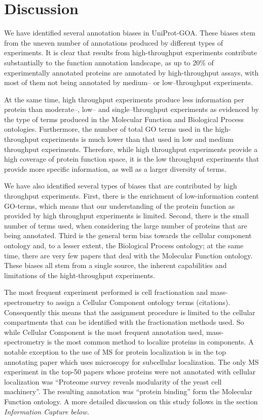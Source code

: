 \documentclass[12pt]{article}
\begin{document}
\section*{Discussion}

We have identified several annotation biases in UniProt-GOA. These biases stem from the
uneven number of annotations produced by different types of experiments. It is clear that
results from high-throughput experiments contribute substantially to the function annotation
landscape, as up to 20\% of experimentally annotated proteins are annotated by
high-throughput assays, with most of them not being annotated by medium-- or
low--\~throughput experiments. 

At the same time, high throughput experiments produce less information per protein than
moderate--, low-- and single--\~throughput experiments as evidenced by the type of terms
produced in the Molecular Function and Biological Process ontologies. Furthermore, the
number of total GO terms used in the high-throughput experiments is much lower than that
used in low and medium throughput experiments. Therefore, while high throughput experiments
provide a high coverage of protein function space, it is the low throughput
experiments that provide more specific information, as well as a larger diversity of terms.

We have also identified several types of biases that are contributed by high throughput experiments.
First, there is the enrichment of low-information content GO-terms, which means that our
understanding of the protein function as provided by high throughput experiments is limited.
Second, there is the small number of terms used, when considering the large number of proteins that
are being annotated. Third is the general term bias towards the cellular component ontology and, to
a lesser extent, the Biological Process ontology; at the same time, there are very few papers that
deal with the Molecular Function ontology.  These biases all stem from a single source, the inherent
capabilities and limitations of the hight-throughput experiments. 

The most frequent experiment performed is cell fractionation and mass-spectrometry to assign a
Cellular Component ontology terms (citations).  Consequently this means that the assignment
procedure is limited to the cellular compartments that can be identified with the fractionation
methods used\cite{MS-papers}. So while Cellular Component is the most frequent annotation used,
mass-spectrometry is the most common method to localize proteins in components. A notable exception
to the use of MS for protein localization is in the top annotating paper \cite{18029348} which uses
microscopy for subcellular localization. The only MS experiment in the top-50 papers 
whose proteins were not annotated with cellular localization was ``Proteome survey reveals
modularity of the yeast cell machinery''\cite{18029348}. The resulting annotation was ``protein
binding'' form the Molecular Function ontology. A more detailed discussion on this study follows in
the section \em{Information Capture} below.
\end{document}
